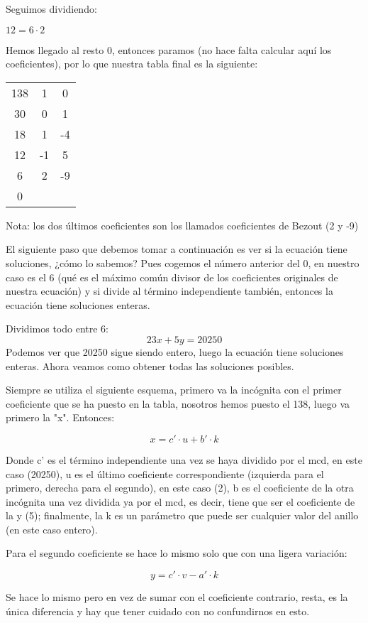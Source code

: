 \documentclass[11pt, a4paper, titlepage]{article}
\begin{document}
Seguimos dividiendo:

$ 12 = 6 \cdot 2 $

Hemos llegado al resto 0, entonces paramos (no hace falta calcular aquí los coeficientes), por lo que
nuestra tabla final es la siguiente:


\begin{center}
\begin{tabular}{c|cc}
138 & 1 & 0 \\
30 & 0 & 1 \\
\hline
18 & 1 & -4 \\
\hline
12 & -1 & 5 \\
\hline
6 & 2 & -9 \\
\hline
0
\end{tabular}
\end{center}


Nota: los dos últimos coeficientes son los llamados coeficientes de Bezout (2 y -9)

El siguiente paso que debemos tomar a continuación es ver si la ecuación tiene soluciones, ¿cómo lo sabemos? Pues cogemos el número anterior del 0, en nuestro caso es el 6 (qué es el máximo común divisor de  los coeficientes originales de nuestra ecuación) y si divide al término independiente también, entonces la ecuación tiene soluciones enteras.

Dividimos todo entre 6:
$$ 23x + 5y = 20250 $$
Podemos ver que 20250 sigue siendo entero, luego la ecuación tiene soluciones enteras. Ahora veamos como
obtener todas las soluciones posibles.

Siempre se utiliza el siguiente esquema, primero va la incógnita con el primer coeficiente que se ha puesto en la tabla, nosotros hemos puesto el 138, luego va primero la "x". Entonces:

$$ x = c' \cdot u + b' \cdot k $$

Donde c' es el término independiente una vez se haya dividido por el mcd, en este caso (20250), u es el último coeficiente correspondiente (izquierda para el primero, derecha para el segundo), en este caso (2), b es el coeficiente de la otra incógnita una vez dividida ya por el mcd, es decir, tiene que ser el coeficiente de la y (5); finalmente, la k es un parámetro que puede ser cualquier valor del anillo (en este caso entero).

Para el segundo coeficiente se hace lo mismo solo que con una ligera variación:

$$ y = c' \cdot v - a' \cdot k $$

Se hace lo mismo pero en vez de sumar con el coeficiente contrario, resta, es la única diferencia y hay que tener cuidado con no confundirnos en esto.
\end{document}
